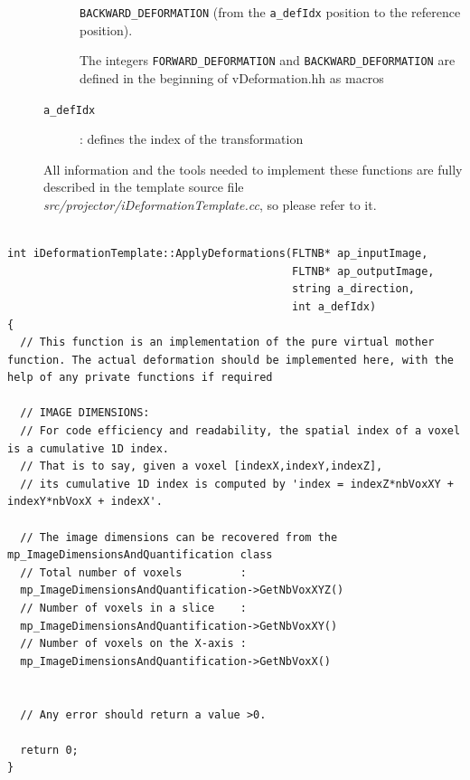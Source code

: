 \documentclass[a4paper, 11pt]{article}
\begin{document}
\begin{description}
\begin{description}
\texttt{BACKWARD\_DEFORMATION} (from the \texttt{a\_defIdx} position to the reference position). 

The integers \texttt{FORWARD\_DEFORMATION} and \texttt{BACKWARD\_DEFORMATION} are defined in the beginning of vDeformation.hh as macros
\item[\texttt{a\_defIdx}]: defines the index of the transformation
\end{description}

All information and the tools needed to implement these functions are fully described in the template source file \textit{src/projector/iDeformationTemplate.cc}, so please refer to it.

\end{description}




\begin{lstlisting}[label={sample},caption= Description of ApplyDeformations function.]

int iDeformationTemplate::ApplyDeformations(FLTNB* ap_inputImage, 
                                            FLTNB* ap_outputImage, 
                                            string a_direction, 
                                            int a_defIdx)
{
  // This function is an implementation of the pure virtual mother function. The actual deformation should be implemented here, with the help of any private functions if required

  // IMAGE DIMENSIONS:
  // For code efficiency and readability, the spatial index of a voxel is a cumulative 1D index. 
  // That is to say, given a voxel [indexX,indexY,indexZ],
  // its cumulative 1D index is computed by 'index = indexZ*nbVoxXY + indexY*nbVoxX + indexX'.

  // The image dimensions can be recovered from the mp_ImageDimensionsAndQuantification class
  // Total number of voxels         : 
  mp_ImageDimensionsAndQuantification->GetNbVoxXYZ()
  // Number of voxels in a slice    : 
  mp_ImageDimensionsAndQuantification->GetNbVoxXY()
  // Number of voxels on the X-axis : 
  mp_ImageDimensionsAndQuantification->GetNbVoxX()
 

  // Any error should return a value >0.
  
  return 0;
}
\end{lstlisting}


\clearpage
\end{document}
